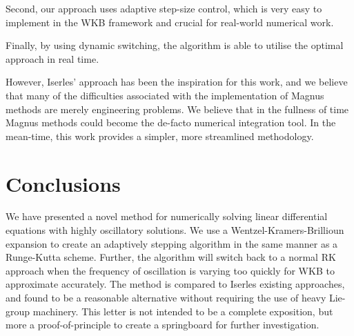 Second, our approach uses adaptive step-size control, which is very easy to implement in the WKB framework and crucial for real-world numerical work.

Finally, by using dynamic switching, the algorithm is able to utilise the optimal approach in real time.

However, Iserles' approach has been the inspiration for this work, and we believe that many of the difficulties associated with the implementation of Magnus methods are merely engineering problems. We believe that in the fullness of time Magnus methods could become the de-facto numerical integration tool. In the mean-time, this work provides a simpler, more streamlined methodology.


\section{Conclusions}



We have presented a novel method for numerically solving linear differential equations with highly oscillatory solutions. We use a Wentzel-Kramers-Brillioun expansion to create an adaptively stepping algorithm in the same manner as a Runge-Kutta scheme. Further, the algorithm will switch back to a normal RK approach when the frequency of oscillation is varying too quickly for WKB to approximate accurately. The method is compared to Iserles existing approaches, and found to be a reasonable alternative without requiring the use of heavy Lie-group machinery. This letter is not intended to be a complete exposition, but more a proof-of-principle to create a springboard for further investigation.




\begin{subappendices}
  
\end{subappendices}


